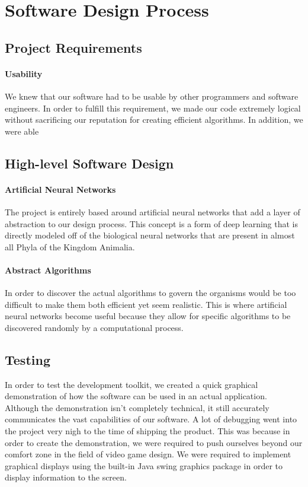 \documentclass[]{article}
\begin{document}
\section{Software Design Process}
	\subsection{Project Requirements}
		\paragraph{Usability} We knew that our software had to be usable by other programmers and software engineers. In order to fulfill this requirement, we made our code extremely logical without sacrificing our reputation for creating efficient algorithms. In addition, we were able 
	\subsection{High-level Software Design}
		\paragraph{Artificial Neural Networks}
		The project is entirely based around artificial neural networks that add a layer of abstraction to our design process. This concept is a form of deep learning that is directly modeled off of the biological neural networks that are present in almost all Phyla of the Kingdom Animalia.
		\paragraph{Abstract Algorithms}
		In order to discover the actual algorithms to govern the organisms would be too difficult to make them both efficient yet seem realistic. This is where artificial neural networks become useful because they allow for specific algorithms to be discovered randomly by a computational process.
	\subsection{Testing}
		In order to test the development toolkit, we created a quick graphical demonstration of how the software can be used in an actual application. Although the demonstration isn't completely technical, it still accurately communicates the vast capabilities of our software. A lot of debugging went into the project very nigh to the time of shipping the product. This was because in order to create the demonstration, we were required to push ourselves beyond our comfort zone in the field of video game design. We were required to implement graphical displays using the built-in Java swing graphics package in order to display information to the screen.
\end{document}
